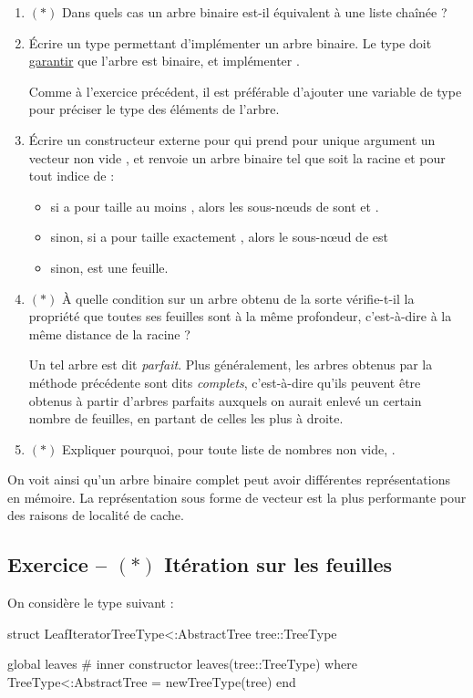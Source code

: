 \documentclass{article}
\newcounter{loop}
\newcounter{numEx}
\newcommand{\exo}[1]{
	\stepcounter{numEx}
	\setcounter{loop}{0}
	\subsection*{Exercice \arabic{numEx} -- #1}
}
\newenvironment{repl}{\vspace{-0.6em}\VerbatimEnvironment\begin{jlrepl}}{\end{jlrepl}}
\begin{document}
\begin{enumerate}
	\item $(*)$ Dans quels cas un arbre binaire est-il équivalent à une liste chaînée ?
	
	\item Écrire un type  permettant d'implémenter un arbre binaire. Le type doit \underline{garantir} que l'arbre est binaire, et implémenter .
	
	Comme à l'exercice précédent, il est préférable d'ajouter une variable de type  pour préciser le type des éléments de l'arbre.
	\item Écrire un constructeur externe pour  qui prend pour unique argument un vecteur non vide , et renvoie un arbre binaire tel que  soit la racine et pour tout indice  de :
	\begin{itemize}
		\item si  a pour taille au moins , alors les sous-nœuds de  sont  et .
		\item sinon, si  a pour taille exactement , alors le sous-nœud de  est 
		\item sinon,  est une feuille.
	\end{itemize}
	
	\item $(*)$ À quelle condition sur  un arbre obtenu de la sorte vérifie-t-il la propriété que toutes ses feuilles sont à la même profondeur, c'est-à-dire à la même distance de la racine ? 
	
	Un tel arbre est dit \emph{parfait}. Plus généralement, les arbres obtenus par la méthode précédente sont dits \emph{complets}, c'est-à-dire qu'ils peuvent être obtenus à partir d'arbres parfaits auxquels on aurait enlevé un certain nombre de feuilles, en partant de celles les plus à droite.
	
	\item $(*)$ Expliquer pourquoi, pour toute liste de nombres  non vide, .
\end{enumerate}

On voit ainsi qu'un arbre binaire complet peut avoir différentes représentations en mémoire. La représentation sous forme de vecteur est la plus performante pour des raisons de localité de cache.

\exo{$(*)$ Itération sur les feuilles}

On considère le type suivant :
\begin{repl}
	struct LeafIterator{TreeType<:AbstractTree}
		tree::TreeType
	
		global leaves  # inner constructor
		leaves(tree::TreeType) where {TreeType<:AbstractTree} = new{TreeType}(tree)
	end
\end{repl}
\end{document}
